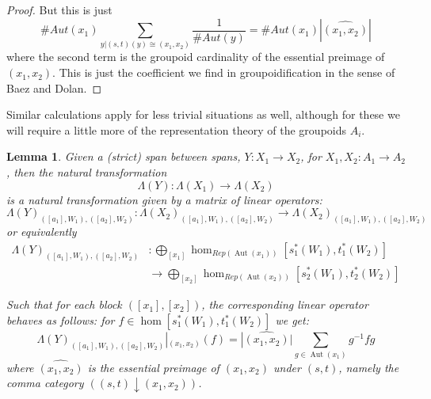 \documentclass[10pt]{amsart}
\numberwithin{theorem}{subsection}
\newtheorem{lemma}[theorem]{Lemma}
\newcommand{\ra}{\mathop{\rightarrow}}
\newcommand{\opname}[1]{\operatorname{#1}}
\newcommand{\FV}{\Lambda}
\begin{document}
\begin{proof}
But this is just
\begin{equation}
\# Aut(x_1) \sum_{y | (s,t)(y) \cong (x_1,x_2)} \frac{1}{\# Aut(y)} = \# Aut(x_1) | \widehat{(x_1,x_2)} |
\end{equation}
where the second term is the groupoid cardinality of the essential
preimage of $(x_1,x_2)$.  This is just the coefficient we find in
groupoidification in the sense of Baez and Dolan.
\end{proof}

Similar calculations apply for less trivial situations as well,
although for these we will require a little more of the representation
theory of the groupoids $A_i$.

\begin{lemma}\label{lemma:coordFVY}Given a (strict) span between spans,
$Y : X_1 \ra X_2$, for $X_1,X_2 : A_1 \ra A_2$, then the natural transformation
\begin{equation}
\FV(Y) : \FV(X_1) \ra \FV(X_2)
\end{equation} is a natural transformation given by a matrix of linear
operators:
\begin{equation}
\FV(Y)_{([a_1],W_1),([a_2],W_2)} : \FV(X_2)_{([a_1],W_1),([a_2],W_2)} \ra \FV(X_2)_{([a_1],W_1),([a_2],W_2)} 
\end{equation}
or equivalently
\begin{align}\label{eq:FVYhomsets}
\FV(Y)_{([a_1],W_1),([a_2],W_2)} & : \bigoplus_{[x_1]}\opname{hom}_{Rep(\opname{Aut}(x_1))}[s_1^{\ast}(W_1),t_1^{\ast}(W_2)]\\ 
\nonumber & \ra \bigoplus_{[x_2]}\opname{hom}_{Rep(\opname{Aut}(x_2))}[s_2^{\ast}(W_1),t_2^{\ast}(W_2)]
\end{align}

Such that for each block $([x_1],[x_2])$, the corresponding
linear operator behaves as follows: for $f \in
\opname{hom}[s_1^{\ast}(W_1),t_1^{\ast}(W_2)]$ we get:
\begin{equation}
\FV(Y)_{([a_1],W_1),([a_2],W_2)}|_{(x_1,x_2)}(f) = |\widehat{(x_1,x_2)}| \sum_{g \in \opname{Aut}(x_1)} g^{-1} f g
\end{equation}
where $\widehat{(x_1,x_2)}$ is the \textit{essential preimage} of
$(x_1,x_2)$ under $(s,t)$, namely the comma category $((s,t)
\downarrow (x_1,x_2))$.
\end{lemma}
\end{document}
